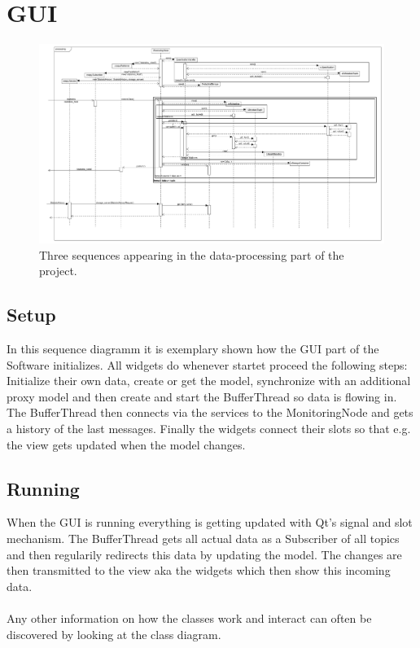 \section{GUI}
\begin{figure}[!ht]
	\begin{center}
		\includegraphics[width=1.0\linewidth]{./diagram_pictures/processing_seq.pdf}
		\caption{Three sequences appearing in the data-processing part of the project.}
	\end{center}
\end{figure}
\subsection{Setup}
In this sequence diagramm it is exemplary shown how the GUI part of the Software initializes.
All widgets do whenever startet proceed the following steps: Initialize their own data, create or get the model, synchronize with an additional proxy model and then create and start the BufferThread so data is flowing in. The BufferThread then connects via the services to the MonitoringNode and gets a history of the last messages.
Finally the widgets connect their slots so that e.g. the view gets updated when the model changes.
\subsection{Running}
When the GUI is running everything is getting updated with Qt's signal and slot mechanism. The BufferThread gets all actual data as a Subscriber of all topics and then regularily redirects this data by updating the model. The changes are then transmitted to the view aka the widgets which then show this incoming data.
\\
\\Any other information on how the classes work and interact can often be discovered by looking at the class diagram.